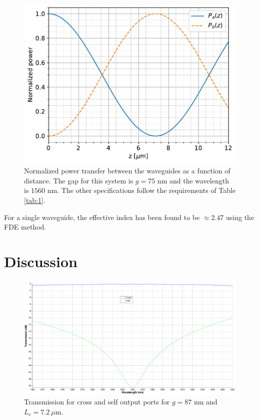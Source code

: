 \documentclass[conference]{IEEEtran}
\begin{document}
\begin{figure}[ht]
\centerline{\includegraphics[width=0.85\linewidth]{projeto2/figs/power_vs_z.pdf}}
\caption{Normalized power transfer between the waveguides as a function of distance. The gap for this system is $g=75$ nm and the wavelength is $1560$ nm. The other specifications follow the requirements of Table \ref{tab:1}.}
\label{fig:power_vs_z}
\end{figure}

For a single waveguide, the effective index has been found to be $\approx 2.47$ using the FDE method.





\section{Discussion}


\begin{figure}[ht]
\centerline{\includegraphics[width=0.9\linewidth]{projeto2/figs/transmission-gap87nm-Lc7.2microm.pdf}}
\caption{ Transmission for cross and self output ports for $g=87$ nm and $L_c = 7.2\ \mu\text{m}$.}
\label{fig:transmission}
\end{figure}
\end{document}
